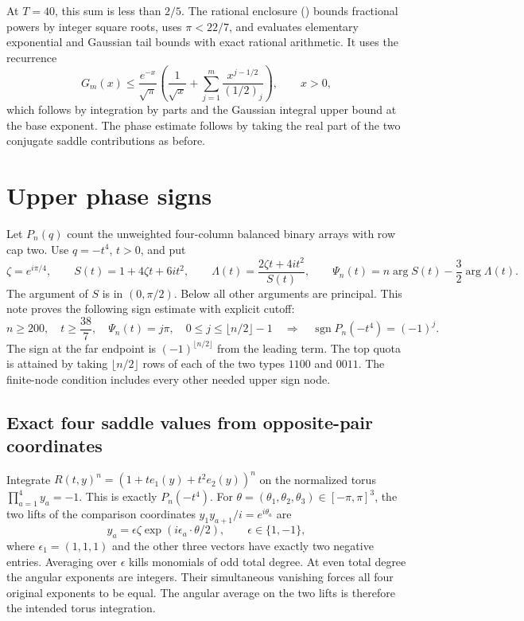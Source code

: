 \documentclass[11pt]{article}
\begin{document}
At $T=40$, this sum is less than $2/5$. The rational enclosure () bounds fractional powers by integer square roots, uses $\pi<22/7$, and evaluates elementary exponential and Gaussian tail bounds with exact rational arithmetic. It uses the recurrence
\[
G_m(x)\le\frac{e^{-x}}{\sqrt\pi}
\left(\frac1{\sqrt x}
+\sum_{j=1}^m\frac{x^{j-1/2}}{(1/2)_j}\right),\qquad x>0,
\]
which follows by integration by parts and the Gaussian integral upper bound at the base exponent. The phase estimate follows by taking the real part of the two conjugate saddle contributions as before.

\section{Upper phase signs}
\label{sec:upper}

Let $P_n(q)$ count the unweighted four-column balanced binary arrays with row cap two. Use $q=-t^4$, $t>0$, and put
\[
\zeta=e^{i\pi/4},\qquad S(t)=1+4\zeta t+6it^2,\qquad
\Lambda(t)=\frac{2\zeta t+4it^2}{S(t)},\qquad
\Psi_n(t)=n\arg S(t)-\frac32\arg\Lambda(t).
\]
The argument of $S$ is in $(0,\pi/2)$. Below all other arguments are principal. This note proves the following sign estimate with explicit cutoff:
\[
n\ge200,\quad t\ge\frac{38}{7},\quad
\Psi_n(t)=j\pi,\quad 0\le j\le\lfloor n/2\rfloor-1
\quad\Longrightarrow\quad
\operatorname{sgn}P_n(-t^4)=(-1)^j.
\]
The sign at the far endpoint is $(-1)^{\lfloor n/2\rfloor}$ from the leading term. The top quota is attained by taking $\lfloor n/2\rfloor$ rows of each of the two types $1100$ and $0011$. The finite-node condition includes every other needed upper sign node.

\subsection{Exact four saddle values from opposite-pair coordinates}
\label{sec:exact-four-saddle-values-from-opposite-pair-coordinates}

Integrate $R(t,y)^n=(1+t e_1(y)+t^2 e_2(y))^n$ on the normalized torus $\prod_{a=1}^4 y_a=-1$. This is exactly $P_n(-t^4)$. For $\theta=(\theta_1,\theta_2,\theta_3)\in[-\pi,\pi]^3$, the two lifts of the comparison coordinates $y_1y_{a+1}/i=e^{i\theta_a}$ are
\[
y_a=\epsilon\zeta \exp(i\epsilon_a\cdot\theta/2),\qquad \epsilon\in\{1,-1\},
\]
where $\epsilon_1=(1,1,1)$ and the other three vectors have exactly two negative entries. Averaging over $\epsilon$ kills monomials of odd total degree. At even total degree the angular exponents are integers. Their simultaneous vanishing forces all four original exponents to be equal. The angular average on the two lifts is therefore the intended torus integration.
\end{document}
